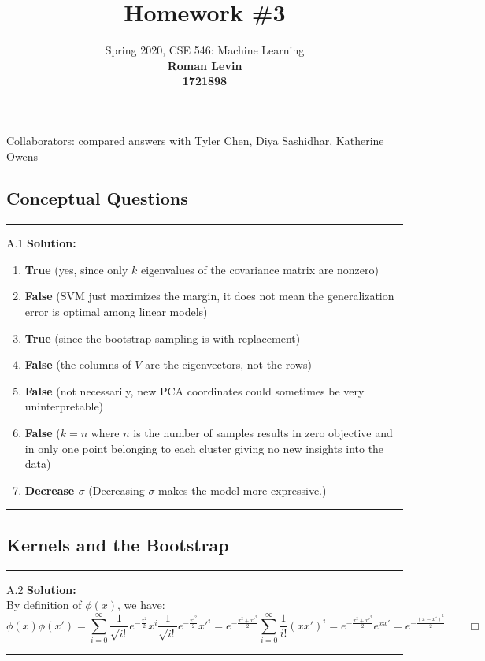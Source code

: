 \documentclass{article}
\date{{}}
\newcommand{\1}{\mathbf{1}}
\begin{document}
\title{Homework \#3}
\author{\normalsize{Spring 2020, CSE 546: Machine Learning}\\
\normalsize{\bf Roman Levin} \\
\normalsize{\bf 1721898} \\
}
\maketitle
Collaborators: compared answers with Tyler Chen, Diya Sashidhar, Katherine Owens

\subsection*{Conceptual Questions}
\noindent\rule{\textwidth}{1pt}

A.1 {\bf Solution:}\\
\begin{enumerate}
    \item {\bf True} (yes, since only $k$ eigenvalues of the covariance matrix are nonzero)
    \item {\bf False} (SVM just maximizes the margin, it does not mean the generalization error is optimal among linear models)
    \item {\bf True} (since the bootstrap sampling is with replacement)
    \item {\bf False} (the columns of $V$ are the eigenvectors, not the rows)
    \item {\bf False} (not necessarily, new PCA coordinates could sometimes be very uninterpretable)
    \item {\bf False} ($k=n$ where $n$ is the number of samples results in zero objective and in only one point belonging to each cluster giving no new insights into the data)
    \item {\bf Decrease $\sigma$} (Decreasing $\sigma$ makes the model more expressive.)
\end{enumerate}

\noindent\rule{\textwidth}{1pt}
\subsection*{Kernels and the Bootstrap}
\noindent\rule{\textwidth}{1pt}
A.2 {\bf Solution:}\\
By definition of $\phi(x)$, we have:
$$
\boxed{\phi(x)\phi(x') = \sum_{i=0}^\infty \frac{1}{\sqrt{i!}}e^{-\frac{x^2}{2}}x^i \frac{1}{\sqrt{i!}}e^{-\frac{x'^2}{2}}x'^i =  e^{-\frac{x^2+x'^2}{2}}\sum_{i=0}^\infty \frac{1}{i!}(xx')^i = e^{-\frac{x^2+x'^2}{2}}e^{xx'} = e^{-\frac{(x-x')^2}{2}} \qquad \Box}
$$
\noindent\rule{\textwidth}{1pt}
\end{document}
